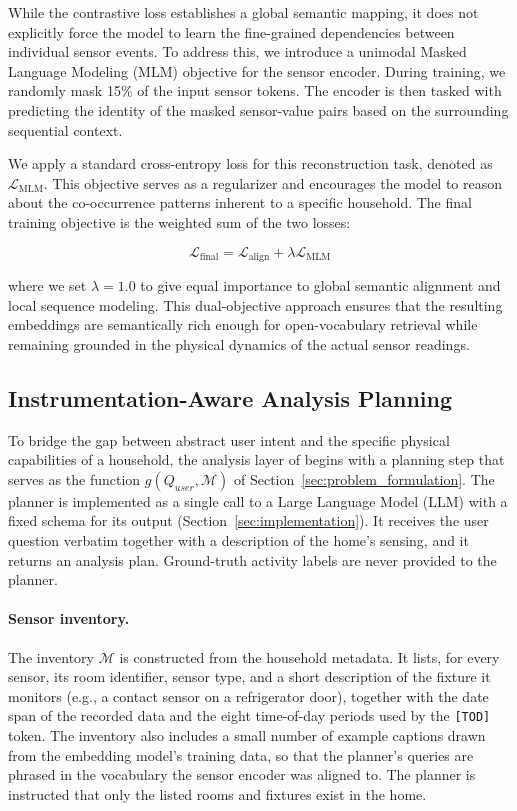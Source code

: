 While the contrastive loss establishes a global semantic mapping, it does not explicitly force the model to learn the fine-grained dependencies between individual sensor events. To address this, we introduce a unimodal Masked Language Modeling (MLM) objective for the sensor encoder. During training, we randomly mask 15\% of the input sensor tokens. The encoder is then tasked with predicting the identity of the masked sensor-value pairs based on the surrounding sequential context.

We apply a standard cross-entropy loss for this reconstruction task, denoted as $\mathcal{L}_{\text{MLM}}$. This objective serves as a regularizer and encourages the model to reason about the co-occurrence patterns inherent to a specific household.
The final training objective is the weighted sum of the two losses:

\begin{equation}
    \mathcal{L}_{\text{final}} = \mathcal{L}_{\text{align}} + \lambda \mathcal{L}_{\text{MLM}}
    \label{eq:loss_final}
\end{equation}

where we set $\lambda = 1.0$ to give equal importance to global semantic alignment and local sequence modeling. This dual-objective approach ensures that the resulting embeddings are semantically rich enough for open-vocabulary retrieval while remaining grounded in the physical dynamics of the actual sensor readings.


\subsection{Instrumentation-Aware Analysis Planning}
\label{sec:query_processing}

To bridge the gap between abstract user intent and the specific physical capabilities of a household, the analysis layer of \ToolName begins with a planning step that serves as the function $g(Q_{user}, \mathcal{M})$ of Section~\ref{sec:problem_formulation}. The planner is implemented as a single call to a Large Language Model (LLM) with a fixed schema for its output (Section~\ref{sec:implementation}). It receives the user question verbatim together with a description of the home's sensing, and it returns an analysis plan. Ground-truth activity labels are never provided to the planner.

\paragraph{Sensor inventory.}
The inventory $\mathcal{M}$ is constructed from the household metadata. It lists, for every sensor, its room identifier, sensor type, and a short description of the fixture it monitors (e.g., a contact sensor on a refrigerator door), together with the date span of the recorded data and the eight time-of-day periods used by the \texttt{[TOD]} token. The inventory also includes a small number of example captions drawn from the embedding model's training data, so that the planner's queries are phrased in the vocabulary the sensor encoder was aligned to. The planner is instructed that only the listed rooms and fixtures exist in the home.

